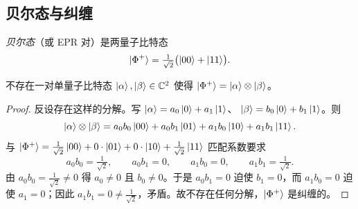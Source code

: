 \begin{center}
\end{center}

\subsection{贝尔态与纠缠}
\label{sec:lec01-bell-sub}

\begin{definition}[贝尔态]\label{def:lec01-bell}
\emph{贝尔态}（或 EPR 对）是两量子比特态
\begin{equation}
  \ket{\Phi^{+}}=\tfrac{1}{\sqrt2}\bigl(\ket{00}+\ket{11}\bigr).
\end{equation}
\end{definition}

\begin{theorem}[贝尔态是纠缠的]\label{thm:lec01-bell}
不存在一对单量子比特态 $\ket{\alpha},\ket{\beta}\in\mathbb{C}^{2}$ 使得
$\ket{\Phi^{+}}=\ket{\alpha}\otimes\ket{\beta}$。
\end{theorem}

\begin{proof}
反设存在这样的分解。写 $\ket{\alpha}=a_0\ket{0}+a_1\ket{1}$、
$\ket{\beta}=b_0\ket{0}+b_1\ket{1}$。则
\[
  \ket{\alpha}\otimes\ket{\beta}
    =a_0 b_0\ket{00}+a_0 b_1\ket{01}+a_1 b_0\ket{10}+a_1 b_1\ket{11}.
\]
与 $\ket{\Phi^{+}}=\tfrac{1}{\sqrt2}\ket{00}+0\cdot\ket{01}+0\cdot\ket{10}+\tfrac{1}{\sqrt2}\ket{11}$
匹配系数要求
\[
  a_0 b_0=\tfrac{1}{\sqrt2},\qquad a_0 b_1=0,\qquad a_1 b_0=0,\qquad a_1 b_1=\tfrac{1}{\sqrt2}.
\]
由 $a_0 b_0=\tfrac{1}{\sqrt2}\neq0$ 得 $a_0\neq0$ 且 $b_0\neq0$。于是
$a_0 b_1=0$ 迫使 $b_1=0$，而 $a_1 b_0=0$ 迫使 $a_1=0$；因此
$a_1 b_1=0\neq\tfrac{1}{\sqrt2}$，矛盾。故不存在任何分解，$\ket{\Phi^{+}}$ 是纠缠的。
\end{proof}

